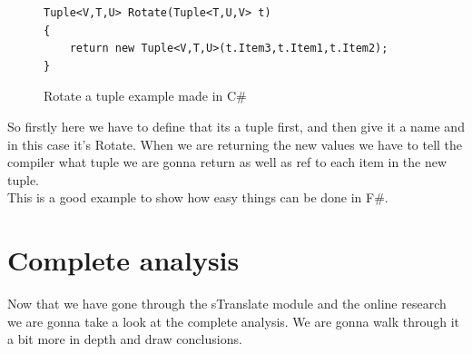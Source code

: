 \documentclass[12pt, a4paper]{article}
\begin{document}
\begin{figure}[!h]
\begin{lstlisting}
Tuple<V,T,U> Rotate(Tuple<T,U,V> t) 
{ 
    return new Tuple<V,T,U>(t.Item3,t.Item1,t.Item2); 
}
\end{lstlisting}
\caption{Rotate a tuple example made in C\#}
\label{fig:RotateTupleCSharp}
\end{figure}

So firstly here we have to define that its a tuple first, and then give it a name and in this case it’s Rotate. When we are returning the new values we have to tell the compiler what tuple we are gonna return as well as ref to each item in the new tuple.\\

This is a good example to show how easy things can be done in F\#.

\newpage
\section{Complete analysis}

Now that we have gone through the sTranslate module and the online research we are gonna take a look at the complete analysis. We are gonna walk through it a bit more in depth and draw conclusions.





\end{document}
